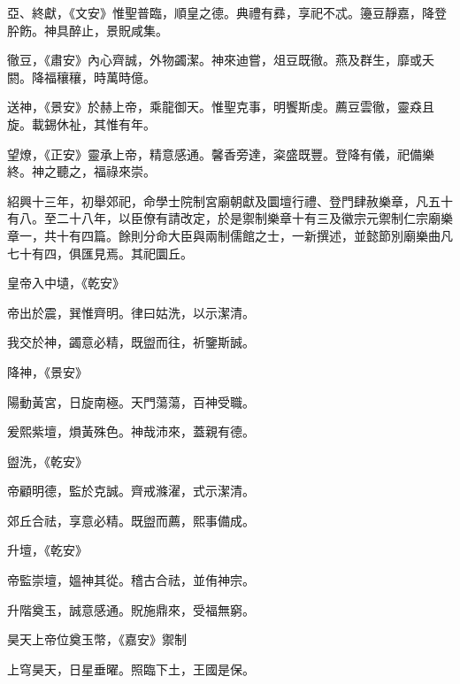 \begin{pinyinscope}
 亞、終獻，《文安》惟聖普臨，順皇之德。典禮有彞，享祀不忒。籩豆靜嘉，降登肸飭。神具醉止，景貺咸集。



 徹豆，《肅安》內心齊誠，外物蠲潔。神來迪嘗，俎豆既徹。燕及群生，靡或夭閼。降福穰穰，時萬時億。



 送神，《景安》於赫上帝，乘龍御天。惟聖克事，明饗斯虔。薦豆雲徹，靈猋且旋。載錫休祉，其惟有年。



 望燎，《正安》靈承上帝，精意感通。馨香旁達，粢盛既豐。登降有儀，祀備樂終。神之聽之，福祿來崇。



 紹興十三年，初舉郊祀，命學士院制宮廟朝獻及圜壇行禮、登門肆赦樂章，凡五十有八。至二十八年，以臣僚有請改定，於是禦制樂章十有三及徽宗元禦制仁宗廟樂章一，共十有四篇。餘則分命大臣與兩制儒館之士，一新撰述，並懿節別廟樂曲凡七十有四，俱匯見焉。其祀圜丘。



 皇帝入中壝，《乾安》



 帝出於震，巽惟齊明。律曰姑洗，以示潔清。



 我交於神，蠲意必精，既盥而往，祈鑒斯誠。



 降神，《景安》



 陽動黃宮，日旋南極。天門蕩蕩，百神受職。



 爰熙紫壇，熉黃殊色。神哉沛來，蓋親有德。



 盥洗，《乾安》



 帝顧明德，監於克誠。齊戒滌濯，式示潔清。



 郊丘合祛，享意必精。既盥而薦，熙事備成。



 升壇，《乾安》



 帝監崇壇，媼神其從。稽古合祛，並侑神宗。



 升階奠玉，誠意感通。貺施鼎來，受福無窮。



 昊天上帝位奠玉幣，《嘉安》禦制



 上穹昊天，日星垂曜。照臨下土，王國是保。




\end{pinyinscope}
